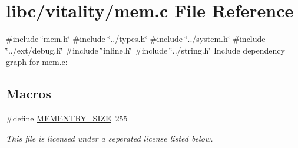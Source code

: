\hypertarget{a00116}{}\section{libc/vitality/mem.c File Reference}
\label{a00116}
{\ttfamily \#include \char`\"{}mem.\+h\char`\"{}}\newline
{\ttfamily \#include \char`\"{}../types.\+h\char`\"{}}\newline
{\ttfamily \#include \char`\"{}../system.\+h\char`\"{}}\newline
{\ttfamily \#include \char`\"{}../ext/debug.\+h\char`\"{}}\newline
{\ttfamily \#include \char`\"{}inline.\+h\char`\"{}}\newline
{\ttfamily \#include \char`\"{}../string.\+h\char`\"{}}\newline
Include dependency graph for mem.\+c\+:
\subsection*{Macros}
\begin{DoxyCompactItemize}
\item 
\#define \hyperlink{a00116_a48623ea6ed429e2f046b49041dde1dc5_a48623ea6ed429e2f046b49041dde1dc5}{M\+E\+M\+E\+N\+T\+R\+Y\+\_\+\+S\+I\+ZE}~255
\begin{DoxyCompactList}\small\item\em This file is licensed under a seperated license listed below. \end{DoxyCompactList}\end{DoxyCompactItemize}
